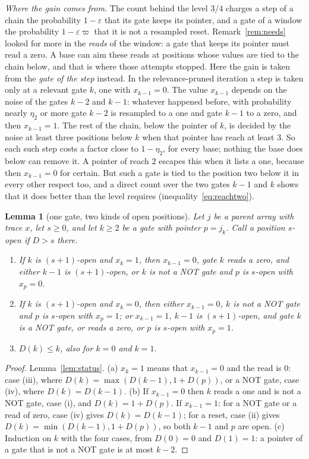 \documentclass[11pt]{amsart}
\newtheorem{lemma}[theorem]{Lemma}
\theoremstyle{definition}
\theoremstyle{remark}
\newcommand{\eps}{\varepsilon}
\begin{document}
\emph{Where the gain comes from.} The count behind the level $3/4$ charges a step of a chain the
probability $1-\eps$ that its gate keeps its pointer, and a gate of a window the probability
$1-\eps\varpi$ that it is not a resampled reset. Remark~\ref{rem:needs} looked for more in the
\emph{reads} of the window: a gate that keeps its pointer must read a zero. A base can aim these
reads at positions whose values are tied to the chain below, and that is where those attempts
stopped. Here the gain is taken from the \emph{gate of the step} instead. In the relevance-pruned
iteration a step is taken only at a relevant gate $k$, one with $x_{k-1}=0$. The value $x_{k-1}$
depends on the noise of the gates $k-2$ and $k-1$: whatever happened before, with probability
nearly $\eta_2$ or more gate $k-2$ is resampled to a one and gate $k-1$ to a zero, and then
$x_{k-1}=1$. The rest of the chain, below the pointer of $k$, is decided by the noise at least
three positions below $k$ when that pointer has reach at least $3$. So each such step costs a
factor close to $1-\eta_2$, for every base;
nothing the base does below can remove it. A pointer of reach $2$ escapes this when it lists a
one, because then $x_{k-1}=0$ for certain. But such a gate is tied to the position two below it in
every other respect too, and a direct count over the two gates $k-1$ and $k$ shows that it does
better than the level requires (inequality~\eqref{eq:reachtwo}).

\begin{lemma}[one gate, two kinds of open positions]\label{lem:twotype}
Let $j$ be a parent array with trace $x$, let $s\ge0$, and let $k\ge2$ be a gate with pointer
$p=j_k$. Call a position \emph{$s$-open} if $D>s$ there.
\begin{enumerate}[label=(\alph*),leftmargin=2.4em]
\item If $k$ is $(s+1)$-open and $x_k=1$, then $x_{k-1}=0$, gate $k$ reads a zero, and either
$k-1$ is $(s+1)$-open, or $k$ is not a NOT gate and $p$ is $s$-open with $x_p=0$.
\item If $k$ is $(s+1)$-open and $x_k=0$, then either $x_{k-1}=0$, $k$ is not a NOT gate and $p$
is $s$-open with $x_p=1$; or $x_{k-1}=1$, $k-1$ is $(s+1)$-open, and gate $k$ is a NOT gate, or
reads a zero, or $p$ is $s$-open with $x_p=1$.
\item $D(k)\le k$, also for $k=0$ and $k=1$.
\end{enumerate}
\end{lemma}

\begin{proof}
Lemma~\ref{lem:status}. (a) $x_k=1$ means that $x_{k-1}=0$ and the read is $0$: case (iii),
where $D(k)=\max(D(k-1),1+D(p))$, or a NOT gate, case (iv), where $D(k)=D(k-1)$. (b) If
$x_{k-1}=0$ then $k$ reads a one and is not a NOT gate, case (i), and $D(k)=1+D(p)$. If
$x_{k-1}=1$: for a NOT gate or a read of zero, case (iv) gives $D(k)=D(k-1)$; for a reset, case
(ii) gives $D(k)=\min(D(k-1),1+D(p))$, so both $k-1$ and $p$ are open. (c) Induction on $k$ with
the four cases, from $D(0)=0$ and $D(1)=1$: a pointer of a gate that is not a NOT gate is at most
$k-2$.
\end{proof}
\end{document}
